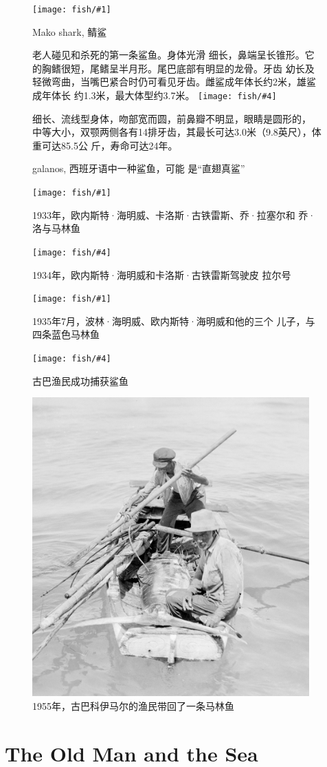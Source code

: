 \documentclass[fontset=ubuntu]{ctexrep}
\newcommand{\dingphotoh}[6] {
  \begin{figure}[htbp!]
    \centering
    \texttt{[image: fish/\#1]}
    \caption{#2}\label{fig:#1}
    \raggedright\small #3
    \vfill \vspace{1cm}
    \centering
    \texttt{[image: fish/\#4]}
    \caption{#5}\label{fig:#4}
    \raggedright\small #6
  \end{figure}
  \clearpage
}
\begin{document}
\dingphotoh{Makoshark}{Mako shark, 鲭鲨}{老人碰见和杀死的第一条鲨鱼。身体光滑
  细长，鼻端呈长锥形。它的胸鳍很短，尾鳍呈半月形。尾巴底部有明显的龙骨。牙齿
  幼长及轻微弯曲，当嘴巴紧合时仍可看见牙齿。雌鲨成年体长约2米，雄鲨成年体长
  约1.3米，最大体型约3.7米。 }{galanos}{galanos, 西班牙语中一种鲨鱼，可能
  是“直翅真鲨”}{细长、流线型身体，吻部宽而圆，前鼻瓣不明显，眼睛是圆形的，
  中等大小，双颚两侧各有14排牙齿，其最长可达3.0米（9.8英尺），体重可达85.5公
  斤，寿命可达24年。}

\dingphotoh{heming1}{1933年，欧内斯特·海明威、卡洛斯·古铁雷斯、乔·拉塞尔和
  乔·洛与马林鱼}{}{heming2}{1934年，欧内斯特·海明威和卡洛斯·古铁雷斯驾驶皮
  拉尔号}{}

\dingphotoh{heming3}{1935年7月，波林·海明威、欧内斯特·海明威和他的三个
  儿子，与四条蓝色马林鱼}{}{heming4}{古巴渔民成功捕获鲨鱼}{}

\begin{figure}[ht!]
  \centering
  \includegraphics[width=0.95\textwidth]{fish/heming5.jpg} \caption{\label{fig:heming5}1955年，古巴科伊马尔的渔民带回了一条马林鱼}
\end{figure}

\chapter{The Old Man and the Sea}
\end{document}
